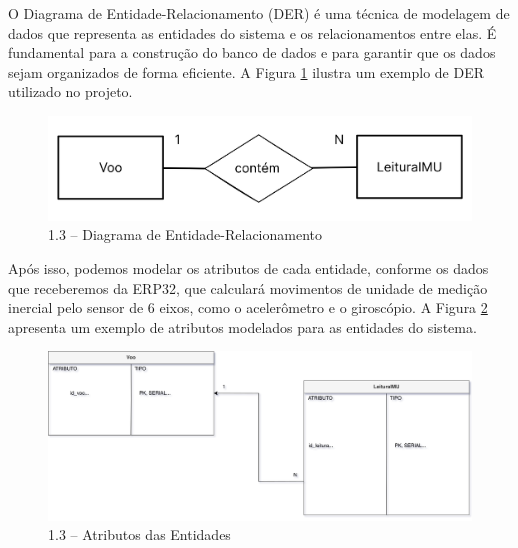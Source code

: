 \begin{samepage}

O Diagrama de Entidade-Relacionamento (DER) é uma técnica de modelagem de dados que representa as entidades do sistema e os relacionamentos entre elas. É fundamental para a construção do banco de dados e para garantir que os dados sejam organizados de forma eficiente. A Figura \ref{fig_der} ilustra um exemplo de DER utilizado no projeto.

\begin{figure}[H]
	\centering
	\includegraphics[width=15cm]{figuras/der.png}
	\caption{1.3 – Diagrama de Entidade-Relacionamento}
	\label{fig_der}
\end{figure}

Após isso, podemos modelar os atributos de cada entidade, conforme os dados que receberemos da ERP32, que calculará movimentos de unidade de medição inercial pelo sensor de 6 eixos, como o acelerômetro e o giroscópio. A Figura \ref{fig_atributos} apresenta um exemplo de atributos modelados para as entidades do sistema.

\begin{figure}[H]
	\centering
	\includegraphics[width=15cm]{figuras/atributos.png}
	\caption{1.3 – Atributos das Entidades}
	\label{fig_atributos}
\end{figure}

\end{samepage}


